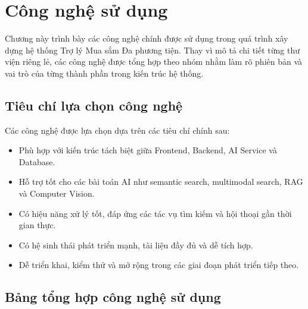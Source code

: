 
\section{Công nghệ sử dụng}

Chương này trình bày các công nghệ chính được sử dụng trong quá trình xây dựng hệ thống Trợ lý Mua sắm Đa phương tiện. Thay vì mô tả chi tiết từng thư viện riêng lẻ, các công nghệ được tổng hợp theo nhóm nhằm làm rõ phiên bản và vai trò của từng thành phần trong kiến trúc hệ thống.

\subsection{Tiêu chí lựa chọn công nghệ}

Các công nghệ được lựa chọn dựa trên các tiêu chí chính sau:

\begin{itemize}
    \item Phù hợp với kiến trúc tách biệt giữa Frontend, Backend, AI Service và Database.
    \item Hỗ trợ tốt cho các bài toán AI như semantic search, multimodal search, RAG và Computer Vision.
    \item Có hiệu năng xử lý tốt, đáp ứng các tác vụ tìm kiếm và hội thoại gần thời gian thực.
    \item Có hệ sinh thái phát triển mạnh, tài liệu đầy đủ và dễ tích hợp.
    \item Dễ triển khai, kiểm thử và mở rộng trong các giai đoạn phát triển tiếp theo.
\end{itemize}

\subsection{Bảng tổng hợp công nghệ sử dụng}

\renewcommand{\arraystretch}{1.25}
\small

